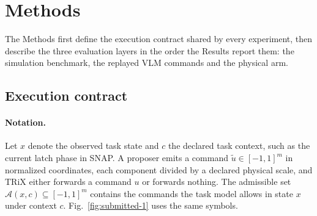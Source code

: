 \documentclass[12pt]{article}
\begin{document}
\section{Methods}

The Methods first define the execution contract shared by every experiment,
then describe the three evaluation layers in the order the Results report
them: the simulation benchmark, the replayed VLM commands and the physical
arm.

\subsection{Execution contract}
\label{sec:authority}
\paragraph{Notation.} Let $x$ denote the observed task state and $c$ the
declared task context, such as the current latch phase in SNAP. A proposer
emits a command $\tilde u\in[-1,1]^m$ in normalized coordinates, each component
divided by a declared physical scale, and TRiX either forwards a command $u$ or
forwards nothing. The admissible set $\mathcal A(x,c)\subseteq[-1,1]^m$
contains the commands the task model allows in state $x$ under context $c$.
Fig.~\ref{fig:submitted-1} uses the same symbols.
\end{document}

